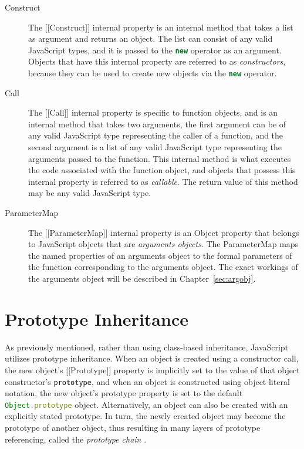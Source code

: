 \documentclass[a4paper,11pt,twoside]{report}
\def\jsinline{\lstinline[language=JavaScript, basicstyle=\small]}%\end{lstlisting}
\begin{document}
\begin{description}
\item[Construct]
The [[Construct]] internal property is an internal method that takes a list as argument and returns an object. The list can consist of any valid JavaScript types, and it is passed to the \jsinline|new| operator as an argument. Objects that have this internal property are referred to as \textit{constructors}, because they can be used to create new objects via the \jsinline|new| operator.

\item[Call]
The [[Call]] internal property is specific to function objects, and is an internal method that takes two arguments, the first argument can be of any valid JavaScript type representing the caller of a function, and the second argument is a list of any valid JavaScript type representing the arguments passed to the function. This internal method is what executes the code associated with the function object, and objects that possess this internal property is referred to as \textit{callable}. The return value of this method may be any valid JavaScript type.

\item[ParameterMap]
The [[ParameterMap]] internal property is an Object property that belongs to JavaScript objects that are \emph{arguments objects}. The ParameterMap maps the named properties of an arguments object to the formal parameters of the function corresponding to the arguments object. The exact workings of the arguments object will be described in Chapter~\ref{sec:argobj}.
\end{description}

\section{Prototype Inheritance}\label{sec:protoinh}
As previously mentioned, rather than using class-based inheritance, JavaScript utilizes prototype inheritance. When an object is created using a constructor call, the new object's [[Prototype]] property is implicitly set to the value of that object constructor's \jsinline|prototype|, and when an object is constructed using object literal notation, the new object's prototype property is set to the default \jsinline|Object.prototype| object. Alternatively, an object can also be created with an explicitly stated prototype. In turn, the newly created object may become the prototype of another object, thus resulting in many layers of prototype referencing, called the \emph{prototype chain} \cite{EcmaScript}. 
\end{document}
